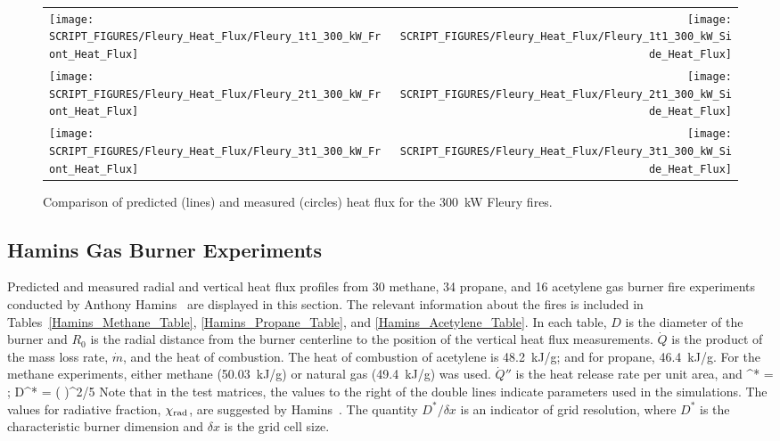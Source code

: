 \begin{figure}[p]
\begin{tabular*}{\textwidth}{l@{\extracolsep{\fill}}r}
\texttt{[image: SCRIPT\_FIGURES/Fleury\_Heat\_Flux/Fleury\_1t1\_300\_kW\_Front\_Heat\_Flux]} &
\texttt{[image: SCRIPT\_FIGURES/Fleury\_Heat\_Flux/Fleury\_1t1\_300\_kW\_Side\_Heat\_Flux]} \\
\texttt{[image: SCRIPT\_FIGURES/Fleury\_Heat\_Flux/Fleury\_2t1\_300\_kW\_Front\_Heat\_Flux]} &
\texttt{[image: SCRIPT\_FIGURES/Fleury\_Heat\_Flux/Fleury\_2t1\_300\_kW\_Side\_Heat\_Flux]} \\
\texttt{[image: SCRIPT\_FIGURES/Fleury\_Heat\_Flux/Fleury\_3t1\_300\_kW\_Front\_Heat\_Flux]} &
\texttt{[image: SCRIPT\_FIGURES/Fleury\_Heat\_Flux/Fleury\_3t1\_300\_kW\_Side\_Heat\_Flux]}
\end{tabular*}
\label{Fleury_Heat_Flux_300_kW}
\caption[Fleury Heat Flux, 300 kW fires]
{Comparison of predicted (lines) and measured (circles) heat flux for the 300~kW Fleury fires.}
\end{figure}

\clearpage

\subsection{Hamins Gas Burner Experiments}

Predicted and measured radial and vertical heat flux profiles from 30 methane, 34 propane, and 16 acetylene gas burner fire experiments conducted by Anthony Hamins~\cite{Hamins:TN2016} are displayed in this section. The relevant information about the fires is included in Tables~\ref{Hamins_Methane_Table}, \ref{Hamins_Propane_Table}, and \ref{Hamins_Acetylene_Table}. In each table, $D$ is the diameter of the burner and $R_0$ is the radial distance from the burner centerline to the position of the vertical heat flux measurements. $\dot{Q}$ is the product of the mass loss rate, $\dot{m}$, and the heat of combustion. The heat of combustion of acetylene is 48.2~kJ/g; and for propane, 46.4~kJ/g. For the methane experiments, either methane (50.03~kJ/g) or natural gas (49.4~kJ/g) was used. $\dot{Q}''$ is the heat release rate per unit area, and
\be
   ^* =    \quad ; \quad    D^* = \left(  \right)^{2/5}
\ee
Note that in the test matrices, the values to the right of the double lines indicate parameters used in the simulations.  The values for radiative fraction, $\chi_{\rm rad}$, are suggested by Hamins~\cite{Hamins:TN2016}. The quantity $D^*/\delta x$ is an indicator of grid resolution, where $D^*$ is the characteristic burner dimension and $\delta x$ is the grid cell size.

